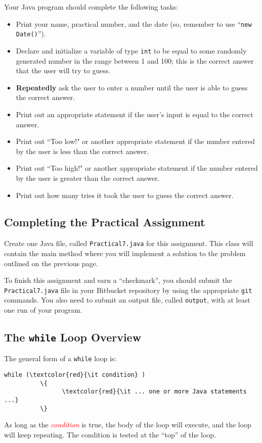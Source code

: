 Your Java program should complete the following tasks:
\begin{itemize}
  \item Print your name, practical number, and the date (so, remember to use ``{\tt new Date()}'').
\item
Declare and initialize a variable of type {\tt int} to be equal to some
randomly generated number in the range between 1 and 100; this is the correct answer that the user will try to guess.
\item
\textbf{Repeatedly} ask the user to enter a number until the user is able to guess the correct answer.
\item
Print out an appropriate statement if the user's input is equal to the correct answer.
\item
Print out ``Too low!" or another appropriate statement if the number entered by the user is less than the correct answer.
\item
Print out ``Too high!" or another appropriate statement if the number entered by the user is greater than the correct answer.
\item Print out how many tries it took the user to guess the correct answer.
\end{itemize}

\vspace*{-.1in}
\subsection*{Completing the Practical Assignment}
\vspace*{-.1in}
Create one Java file, called {\tt Practical7.java} for this assignment.
This class will contain the main method where you will implement a
solution to the problem outlined on the previous page.

\noindent To finish this assignment and earn a ``checkmark'', you should submit the
{\tt Practical7.java} file in your Bitbucket repository by using
the appropriate {\tt git} commands. You also need to submit an output file,
called {\tt output}, with at least one run of your program.

\vspace{-0.1in}
\subsection*{The {\tt while} Loop Overview}
\vspace*{-.05in}
The general form of a {\tt while} loop is:
\begin{Verbatim}[commandchars=\\\{\}]
          while (\textcolor{red}{\it condition} )
          \{
                \textcolor{red}{\it ... one or more Java statements ...}
          \}
\end{Verbatim}
\vspace{-0.15in}
As long as the \textcolor{red}{\it condition} is true, the body of the loop
will execute, and the loop will
keep repeating. The condition is tested at the ``top'' of the loop.

